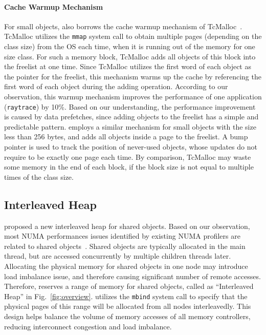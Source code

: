 
\paragraph{Cache Warmup Mechanism} For small objects, \NM{} also borrows the cache warmup mechanism of TcMalloc~\cite{tcmalloc}. TcMalloc utilizes the \texttt{mmap} system call to obtain multiple pages (depending on the class size) from the OS each time, when it is running out of the memory for one size class. For such a memory block, TcMalloc adds all objects of this block into the freelist at one time. Since TcMalloc utilizes the first word of each object as the pointer for the freelist, this mechanism warms up the cache by referencing the first word of each object during the adding operation. According to our observation, this warmup mechanism improves the performance of one application (\texttt{raytrace}) by 10\%. Based on our understanding, the performance improvement is caused by data prefetches, since adding objects to the freelist has a simple and predictable pattern. \NM{} employs a similar mechanism for small objects with the size less than 256 bytes, and adds all objects inside a page to the freelist. A bump pointer is used to track the position of never-used objects, whose updates do not require to be exactly one page each time. By comparison, TcMalloc may waste some memory in the end of each block, if the block size is not equal to multiple times of the class size.   

\subsection{Interleaved Heap} 
\label{sec:mainthread}

\NA{} proposed a new interleaved  heap for shared objects. Based on our observation, most NUMA performances issues identified by existing NUMA profilers are related to shared objects~\cite{XULIU, MemProf}. Shared objects are typically allocated in the main thread, but are accessed concurrently by multiple children threads later. Allocating the physical memory for shared objects in one node may introduce load imbalance issue, and therefore causing significant number of remote accesses. Therefore, \NA{} reserves a range of memory for shared objects, called as ``Interleaved Heap'' in Fig.~\ref{fig:overview}. \NA{} utilizes the \texttt{mbind} system call to specify that the physical pages of this range will be allocated from all nodes interleavedly. This design helps balance the volume of memory accesses of all memory controllers, reducing interconnect congestion and load imbalance. 

